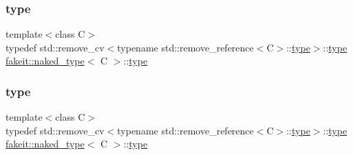 \mbox{\label{structfakeit_1_1naked__type_a3248a6c417c3a06d6e93576085fe7fcc}} 
\subsubsection{\texorpdfstring{type}{type}\hspace{0.1cm}{\footnotesize\ttfamily [2/9]}}
{\footnotesize\ttfamily template$<$class C$>$ \\
typedef std\+::remove\+\_\+cv$<$typename std\+::remove\+\_\+reference$<$C$>$\+::\mbox{\hyperlink{structfakeit_1_1naked__type_a3248a6c417c3a06d6e93576085fe7fcc}{type}}$>$\+::\mbox{\hyperlink{structfakeit_1_1naked__type_a3248a6c417c3a06d6e93576085fe7fcc}{type}} \mbox{\hyperlink{structfakeit_1_1naked__type}{fakeit\+::naked\+\_\+type}}$<$ C $>$\+::\mbox{\hyperlink{structfakeit_1_1naked__type_a3248a6c417c3a06d6e93576085fe7fcc}{type}}}

\mbox{\label{structfakeit_1_1naked__type_a3248a6c417c3a06d6e93576085fe7fcc}} 
\subsubsection{\texorpdfstring{type}{type}\hspace{0.1cm}{\footnotesize\ttfamily [3/9]}}
{\footnotesize\ttfamily template$<$class C$>$ \\
typedef std\+::remove\+\_\+cv$<$typename std\+::remove\+\_\+reference$<$C$>$\+::\mbox{\hyperlink{structfakeit_1_1naked__type_a3248a6c417c3a06d6e93576085fe7fcc}{type}}$>$\+::\mbox{\hyperlink{structfakeit_1_1naked__type_a3248a6c417c3a06d6e93576085fe7fcc}{type}} \mbox{\hyperlink{structfakeit_1_1naked__type}{fakeit\+::naked\+\_\+type}}$<$ C $>$\+::\mbox{\hyperlink{structfakeit_1_1naked__type_a3248a6c417c3a06d6e93576085fe7fcc}{type}}}

\mbox{\label{structfakeit_1_1naked__type_a3248a6c417c3a06d6e93576085fe7fcc}} 
